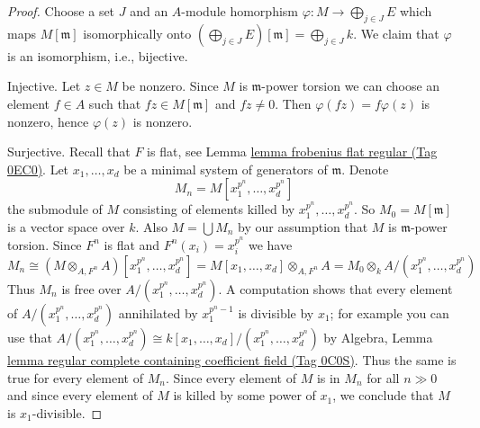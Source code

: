 \documentclass{amsart}
\theoremstyle{plain}
\theoremstyle{definition}
\theoremstyle{remark}
\numberwithin{equation}{subsection}
\begin{document}
\begin{proof}
Choose a set $J$ and an $A$-module homorphism
$\varphi : M \to \bigoplus_{j \in J} E$ which maps
$M[\mathfrak m]$ isomorphically onto
$(\bigoplus_{j \in J} E)[\mathfrak m] = \bigoplus_{j \in J} k$.
We claim that $\varphi$ is an isomorphism, i.e., bijective.

\medskip\noindent
Injective. Let $z \in M$ be nonzero. Since $M$ is $\mathfrak m$-power torsion
we can choose an element $f \in A$ such that $fz \in M[\mathfrak m]$ and
$fz \not = 0$. Then $\varphi(fz) = f\varphi(z)$ is nonzero, hence
$\varphi(z)$ is nonzero.

\medskip\noindent
Surjective. Recall that $F$ is flat, see
Lemma \href{https://stacks.math.columbia.edu/tag/0EC0}{lemma frobenius flat regular (Tag 0EC0)}.
Let $x_1, \ldots, x_d$ be a minimal system of generators of
$\mathfrak m$. Denote
$$
M_n = M[x_1^{p^n}, \ldots, x_d^{p^n}]
$$
the submodule of $M$ consisting of elements killed by
$x_1^{p^n}, \ldots, x_d^{p^n}$. So $M_0 = M[\mathfrak m]$
is a vector space over $k$. Also $M = \bigcup M_n$ by our
assumption that $M$ is $\mathfrak m$-power torsion. Since $F^n$ is flat and
$F^n(x_i) = x_i^{p^n}$ we have
$$
M_n \cong (M \otimes_{A, F^n} A)[x_1^{p^n}, \ldots, x_d^{p^n}] =
M[x_1, \ldots, x_d] \otimes_{A, F^n} A =
M_0 \otimes_k A/(x_1^{p^n}, \ldots, x_d^{p^n})
$$
Thus $M_n$ is free over $A/(x_1^{p^n}, \ldots, x_d^{p^n})$.
A computation shows that every element of $A/(x_1^{p^n}, \ldots, x_d^{p^n})$
annihilated by $x_1^{p^n - 1}$ is divisible by $x_1$; for example
you can use that $A/(x_1^{p^n}, \ldots, x_d^{p^n}) \cong
k[x_1, \ldots, x_d]/(x_1^{p^n}, \ldots, x_d^{p^n})$ by Algebra, Lemma
\href{https://stacks.math.columbia.edu/tag/0C0S}{lemma regular complete containing coefficient field (Tag 0C0S)}.
Thus the same is true for every element of $M_n$.
Since every element of $M$ is in $M_n$ for all $n \gg 0$
and since every element of $M$ is killed by some power of
$x_1$, we conclude that $M$ is $x_1$-divisible.


\end{proof}
\end{document}
